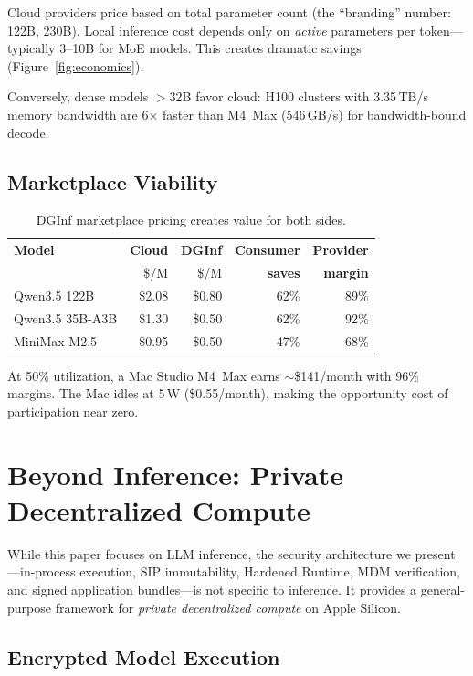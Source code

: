\documentclass[10pt,twocolumn,letterpaper]{article}
\begin{document}
Cloud providers price based on total parameter count (the ``branding'' number: 122B, 230B). Local inference cost depends only on \emph{active} parameters per token---typically 3--10B for MoE models. This creates dramatic savings (Figure~\ref{fig:economics}).

Conversely, dense models $>$32B favor cloud: H100 clusters with 3.35\,TB/s memory bandwidth are 6$\times$ faster than M4~Max (546\,GB/s) for bandwidth-bound decode.

\subsection{Marketplace Viability}

\begin{table}[h]
\centering
\caption{DGInf marketplace pricing creates value for both sides.}
\vspace{4pt}
\small
\begin{tabular}{@{}lrrrr@{}}
\toprule
\textbf{Model} & \textbf{Cloud} & \textbf{DGInf} & \textbf{Consumer} & \textbf{Provider} \\
& \$/M & \$/M & \textbf{saves} & \textbf{margin} \\
\midrule
Qwen3.5 122B & \$2.08 & \$0.80 & 62\% & 89\% \\
Qwen3.5 35B-A3B & \$1.30 & \$0.50 & 62\% & 92\% \\
MiniMax M2.5 & \$0.95 & \$0.50 & 47\% & 68\% \\
\bottomrule
\end{tabular}
\end{table}

At 50\% utilization, a Mac Studio M4~Max earns $\sim$\$141/month with 96\% margins. The Mac idles at 5\,W (\$0.55/month), making the opportunity cost of participation near zero.

\section{Beyond Inference: Private Decentralized Compute}

While this paper focuses on LLM inference, the security architecture we present---in-process execution, SIP immutability, Hardened Runtime, MDM verification, and signed application bundles---is not specific to inference. It provides a general-purpose framework for \emph{private decentralized compute} on Apple Silicon.

\subsection{Encrypted Model Execution}
\end{document}
